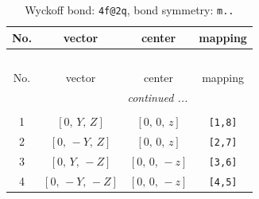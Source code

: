 \documentclass[fleqn,8pt]{jsarticle}
\begin{document}
\renewcommand{\arraystretch}{1.2}
\begin{longtable}{cccc}
\caption{Wyckoff bond: {\tt 4f@2q}, bond symmetry: {\tt m..}}
 \\
 \hline \hline
No. & vector & center & mapping \\ \hline \endfirsthead

\multicolumn{3}{l}{\tablename\ \thetable{}} \\
 \hline \hline
No. & vector & center & mapping \\ \hline \endhead

 \hline \hline
\multicolumn{3}{r}{\footnotesize\it continued ...} \\ \endfoot

 \hline \hline
\multicolumn{3}{r}{} \\ \endlastfoot

1 & $\left[ 0,\, Y,\, Z \right]$ & $\left[ 0,\, 0,\, z \right]$ & {\tt [1,8]} \\ \hline
2 & $\left[ 0,\, - Y,\, Z \right]$ & $\left[ 0,\, 0,\, z \right]$ & {\tt [2,7]} \\ \hline
3 & $\left[ 0,\, Y,\, - Z \right]$ & $\left[ 0,\, 0,\, - z \right]$ & {\tt [3,6]} \\ \hline
4 & $\left[ 0,\, - Y,\, - Z \right]$ & $\left[ 0,\, 0,\, - z \right]$ & {\tt [4,5]} \\
\end{longtable}
\renewcommand{\arraystretch}{1.2}
\end{document}
